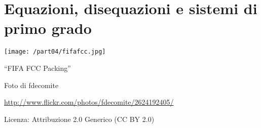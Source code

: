\part{Equazioni, disequazioni e sistemi di primo grado}
\texttt{[image: /part04/fifafcc.jpg]}
  \begin{center}
    {\large ``FIFA FCC Packing''}\par
    Foto di fdecomite\par
    \url{http://www.flickr.com/photos/fdecomite/2624192405/}\par
    Licenza: Attribuzione 2.0 Generico (CC BY 2.0)\par
  \end{center}
\clearpage
\cleardoublepage

